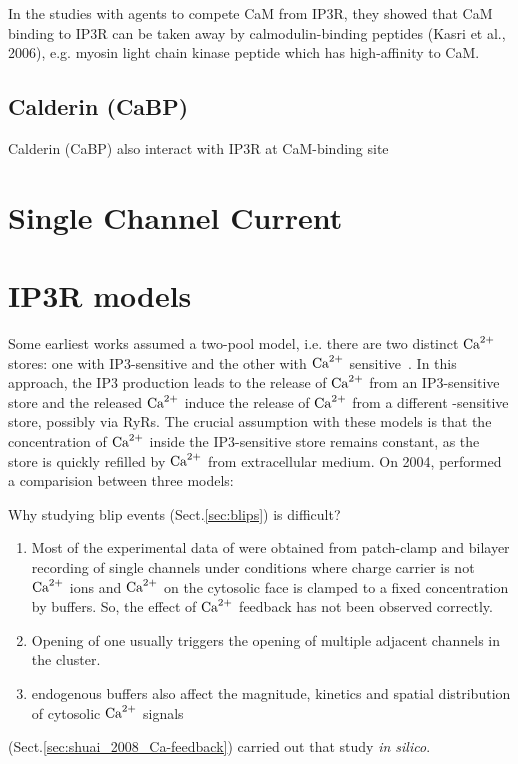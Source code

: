 In the studies with agents to compete CaM from IP3R, they showed that CaM
binding to IP3R can be taken away by calmodulin-binding peptides (Kasri et al.,
2006), e.g. myosin light chain kinase peptide which has high-affinity to CaM.


\subsection{Calderin (CaBP)}

Calderin (CaBP) also interact with IP3R at CaM-binding site



\section{Single Channel Current}


\citep{mak1994, mak1998}

\section{IP3R models}
\label{sec:IP3R_models}

Some earliest works assumed a two-pool model, i.e.
there are two distinct ${\text{Ca}^{2+}}$ stores: one with IP3-sensitive and the other with
${\text{Ca}^{2+}}$ sensitive~\cite{dupont1989ip3}. In this approach, the IP3 production leads
to the release of ${\text{Ca}^{2+}}$ from an IP3-sensitive store and the released ${\text{Ca}^{2+}}$
induce the release of ${\text{Ca}^{2+}}$ from a different -sensitive store,
possibly via RyRs. The crucial assumption with these models is that the
concentration of ${\text{Ca}^{2+}}$ inside the IP3-sensitive store remains constant, as the
store is quickly refilled by ${\text{Ca}^{2+}}$ from extracellular medium. On 2004,
\citep{sneyd2004} performed a comparision between three models:

Why studying blip events (Sect.\ref{sec:blips}) is difficult?
\begin{enumerate}

  \item Most of the experimental data of \tIPthreeR were obtained from
  patch-clamp and bilayer recording of single \tIPthreeR channels under
  conditions where charge carrier is not ${\text{Ca}^{2+}}$ ions and ${\text{Ca}^{2+}}$ on the cytosolic
  face is clamped to a fixed concentration by buffers. So, the effect of ${\text{Ca}^{2+}}$
  feedback has not been observed correctly.

  \item Opening of one \tIPthreeR usually triggers the opening of multiple
adjacent channels in the cluster.

  \item endogenous buffers also affect the magnitude, kinetics and spatial
distribution of cytosolic ${\text{Ca}^{2+}}$ signals
\end{enumerate}
\citep{shuai2008} (Sect.\ref{sec:shuai_2008_Ca-feedback}) carried out that study
{\it in silico}.

